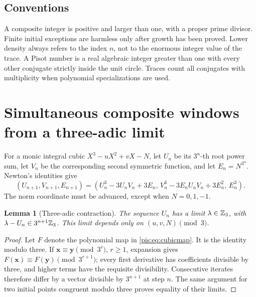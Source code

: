 \documentclass[11pt,a4paper]{article}
\newtheorem{lemma}[theorem]{Lemma}
\theoremstyle{definition}\newtheorem{definition}[theorem]{Definition}
\theoremstyle{remark}\newtheorem{remark}[theorem]{Remark}
\begin{document}
\subsection{Conventions}
A composite integer is positive and larger than one, with a proper
prime divisor. Finite initial exceptions are harmless only after
growth has been proved. Lower density always refers to the index
$n$, not to the enormous integer value of the trace. A Pisot number
is a real algebraic integer greater than one with every other
conjugate strictly inside the unit circle. Traces count all conjugates
with multiplicity when polynomial specializations are used.


\section{Simultaneous composite windows from a three-adic limit}\label{pis:sec:windows}
For a monic integral cubic $X^3-uX^2+vX-N$, let $U_n$ be its
$3^n$-th root power sum, let $V_n$ be the corresponding second
symmetric function, and let $E_n=N^{3^n}$. Newton's identities give
\begin{equation}\label{pis:eq:cubicmap}
 (U_{n+1},V_{n+1},E_{n+1})=
 (U_n^3-3U_nV_n+3E_n,\,
 V_n^3-3E_nU_nV_n+3E_n^2,\,E_n^3).
\end{equation}
The norm coordinate must be advanced, except when $N=0,1,-1$.

\begin{lemma}[Three-adic contraction]\label{pis:lem:contraction}
The sequence $U_n$ has a limit $\lambda\in\mathbb Z_3$, with
$\lambda-U_n\in3^{n+1}\mathbb Z_3$. This limit depends only on
$(u,v,N)\pmod3$.
\end{lemma}
\begin{proof}
Let $F$ denote the polynomial map in \eqref{pis:eq:cubicmap}. It is the
identity modulo three. If $\mathbf x\equiv\mathbf y\pmod{3^r}$,
$r\ge1$, expansion gives
$F(\mathbf x)\equiv F(\mathbf y)\pmod{3^{r+1}}$; every first
derivative has coefficients divisible by three, and higher terms
have the requisite divisibility. Consecutive iterates therefore
differ by a vector divisible by $3^{n+1}$ at step $n$. The same
argument for two initial points congruent modulo three proves
equality of their limits.
\end{proof}
\end{document}
